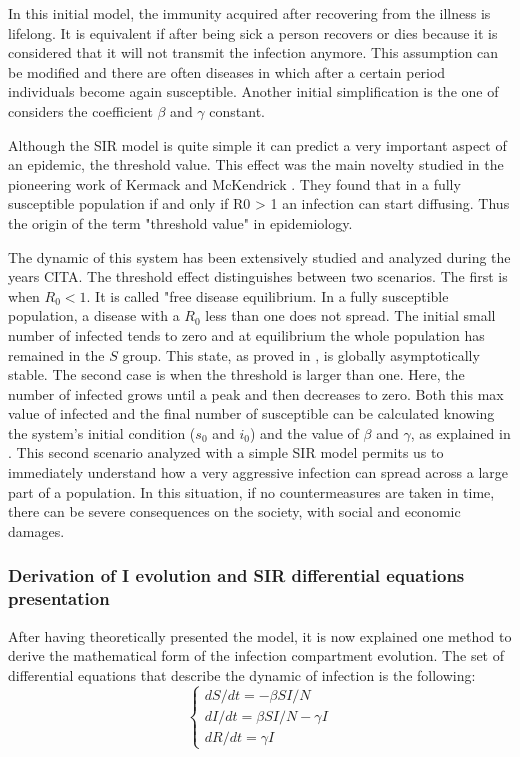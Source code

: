 In this initial model, the immunity acquired after recovering from the illness is lifelong. It is equivalent if after being sick a person recovers or dies because it is considered that it will not transmit the infection anymore.  This assumption can be modified and there are often diseases in which after a certain period individuals become again susceptible. Another initial simplification is the one of considers the coefficient $\beta$ and $\gamma$ constant. 

Although the SIR model is quite simple it can predict a very important aspect of an epidemic, the threshold value. This effect was the main novelty studied in the pioneering work of Kermack and McKendrick \cite{kermack1927}. They found that in a fully susceptible population if and only if R0 > 1 an infection can start diffusing. Thus the origin of the term "threshold value" in epidemiology. 

The dynamic of this system has been extensively studied and analyzed during the years CITA. The threshold effect distinguishes between two scenarios. The first is when $R_0 <1 $. It is called "free disease equilibrium. 
In a fully susceptible population, a disease with a $R_0$ less than one does not spread. The initial small number of infected tends to zero and at equilibrium the whole population has remained in the $S$ group. This state, as proved in \cite{Hernandez_Vargas_2022}, is globally asymptotically stable. The second case is when the threshold is larger than one. Here, the number of infected grows until a peak and then decreases to zero. Both this max value of infected and the final number of susceptible can be calculated knowing the system's initial condition ($s_0$ and $i_0$) and the value of $\beta$ and $\gamma$, as explained in \cite{Hethcote_2000}. 
This second scenario analyzed with a simple SIR model permits us to immediately understand how a very aggressive infection can spread across a large part of a population. In this situation, if no countermeasures are taken in time, there can be severe consequences on the society, with social and economic damages. 

\subsubsection{Derivation of I evolution and SIR differential equations presentation}
After having theoretically presented the model, it is now explained one method to derive the mathematical form of the infection compartment evolution. 
The set of differential equations that  describe the dynamic of infection is the following:
\begin{equation}
	\begin{cases}
		dS / dt = -\beta S I/N \\
		dI / dt = \beta S I/N - \gamma I\\
		dR / dt =  \gamma I
	\end{cases}
\end{equation}

